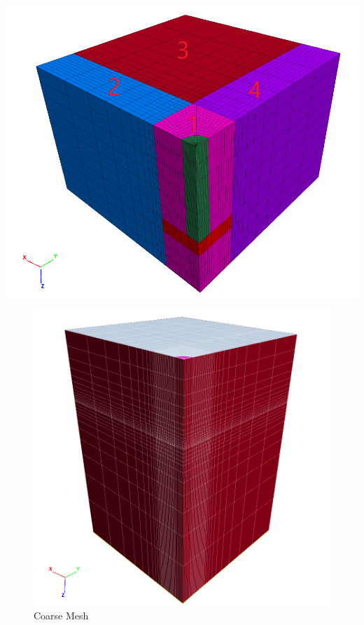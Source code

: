 \documentclass[a4paper, nobind]{templates/ociamthesis}
\begin{document}
\includegraphics[width=1\linewidth]{myfigureeeeee/blocks2}

\begin{figure}[H]
\includegraphics[width=1\linewidth]{myfigureeeeee/coarse} \caption{Coarse Mesh}\label{fig:unnamed-chunk-6}
\end{figure}
\end{document}
